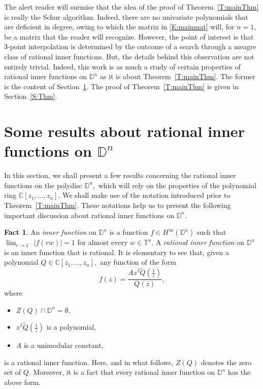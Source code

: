 \documentclass[11pt, reqno]{amsart}
\numberwithin{equation}{section}
\theoremstyle{definition}
\newtheorem{fact}[definition]{Fact}
\theoremstyle{remark}
\theoremstyle{plain}
\begin{document}
The alert reader will surmise that the idea of the proof of Theorem~\ref{T:mainThm} is really
the Schur algorithm. Indeed, there are no univariate polynomials that are deficient in degree, owing to
which the matrix in \eqref{E:mainmat} will, for $n = 1,$ be a matrix that the reader will recognize.
However, the point of interest is that 3-point interpolation is determined by the outcome of a
search through a meagre class of rational inner functions. But, the details behind this 
observation are not entirely trivial. Indeed, this work is as much a study of certain properties
of rational inner functions on ${\mathbb{D}}^n$ as it is about Theorem~\ref{T:mainThm}.
The former is the content of Section~\ref{S:prelim-res}.
The proof of Theorem~\ref{T:mainThm} is given in Section~\ref{S:Thm}.
\medskip

\section{Some results about rational inner functions on ${\mathbb{D}}^n$}\label{S:prelim-res}

In this section, we shall present a few results concerning the rational inner functions 
on the polydisc $\mathbb{D}^n,$ which will rely on the properties of the polynomial ring
${\mathbb{C}}[z_1,\dots, z_n].$ We shall make use of the notation introduced prior to 
Theorem~\ref{T:mainThm}. These notations help us to present the following 
important discussion about rational inner functions on ${\mathbb{D}}^n.$

\begin{fact}\label{SS:rif}
An {\em inner function} on ${\mathbb{D}}^n$ is a function $f\in H^{\infty}({\mathbb{D}}^n)$ such that
$\lim_{r\to 1^{-}}|f(rw)|=1$ for almost every $w\in\mathbb{T}^n.$ A {\em rational inner function} on ${\mathbb{D}}^n$
is an inner function that is rational. It is elementary to see that, given a polynomial
$Q\in{\mathbb{C}}[z_1,\dots,z_n],$ any function of the form
\[ f(z)=\frac{Az^{\beta}\widetilde{Q}(\frac{1}{z})}{Q(z)},\]
where 
\begin{itemize}
\item $Z(Q)\cap{\mathbb{D}}^n=\emptyset,$
\item $z^{\beta}\widetilde{Q}(\frac{1}{z})$ is a polynomial,
\item $A$ is a unimodular constant,
\end{itemize}
is a rational inner function. Here, and in what follows, $Z(Q)$ denotes the zero set of $Q.$
Moreover, it is a fact \cite[Theorem 5.2.5]{rudin:ftp69} that every rational inner function on ${\mathbb{D}}^n$
has the above form.
\end{fact}
\smallskip
\end{document}
